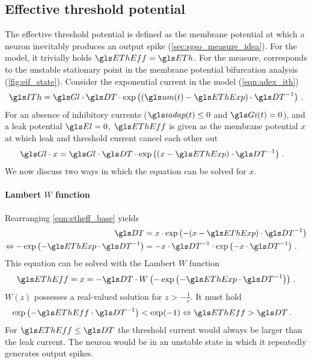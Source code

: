\subsection{Effective threshold potential}
\label{sec:effective_threshold_potential}

The effective threshold potential \EThEff is defined as the membrane potential at which a neuron inevitably produces an output spike (\cref{sec:sgso_measure_idea}). For the \LIF model, it trivially holds $\EThEff = \ETh$. For the \AdEx measure, \EThEff corresponds to the unstable stationary point in the membrane potential bifurcation analysis (\cref{fig:eif_state}). Consider the exponential current \ITh in the \AdEx model (\cref{eqn:adex_ith})
\begin{align}
	\ITh = \Gl \cdot \DT \cdot \exp\left((\um(t) - \EThExp) \cdot \DT^{-1}\right)\,.
\end{align}
For an absence of inhibitory currents ($\iadap(t) \leq 0$ and $\Gi(t) = 0$), and a leak potential $\El = 0$, $\EThEff$ is given as the membrane potential $x$ at which leak and threshold current cancel each other out
\begin{align}
	\Gl \cdot x &= \Gl \cdot \DT \cdot \exp\left( (x - \EThExp) \cdot \DT^{-1} \right) \,.
	\label{eqn:etheff_base}
\end{align}
We now discuss two ways in which the equation can be solved for $x$.

\paragraph{Lambert $W$ function}
Rearranging \cref{eqn:etheff_base} yields
\begin{align}
	\DT &= x \cdot \exp\left(- (x - \EThExp) \cdot \DT^{-1} \right) \notag\\
	\Leftrightarrow - \exp\left(- \EThExp \cdot \DT^{-1} \right) &= - x \cdot \DT^{-1}  \cdot \exp\left(- x \cdot \DT^{-1} \right) \,.
\end{align}
This equation can be solved with the Lambert $W$ function \cite{corless1996lambertw}
\begin{align}
	\EThEff = x = - \DT \cdot W\left(- \exp\left(- \EThExp \cdot \DT^{-1} \right) \right) \,.
\end{align}
$W(z)$ possesses a real-valued solution for $z > -\frac{1}{e}$. It must hold
\begin{align}
	\exp\left(- \EThEff \cdot \DT^{-1} \right) < \exp(-1) \Leftrightarrow \EThEff &> \DT \,.
\end{align}
For $\EThEff \leq \DT$ the threshold current \ITh would always be larger than the leak current. The neuron would be in an unstable state in which it repeatedly generates output spikes.

